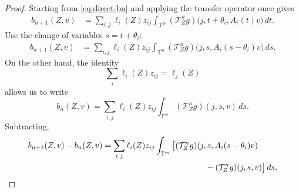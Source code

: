 \documentclass[11pt,a4paper]{amsart}
\newcommand{\T}{\mathbb T}
\begin{document}
\begin{proof}

Starting from \eqref{eq:direct-bn} and applying the transfer operator
once gives
\[
\begin{aligned}
 b_{n+1}(Z,v)
 &=
 \sum_{i,j}\ell_i(Z)z_{ij}
 \int_{\T^m}
 (\mathcal T_Z^ng)
 \bigl(j,t+\theta_i,A_i(t)v\bigr)\,dt.
\end{aligned}
\]
Use the change of variables \(s=t+\theta_i\):
\[
\begin{aligned}
 b_{n+1}(Z,v)
 &=
 \sum_{i,j}\ell_i(Z)z_{ij}
 \int_{\T^m}
 (\mathcal T_Z^ng)
 \bigl(j,s,A_i(s-\theta_i)v\bigr)\,ds.
\end{aligned}
\]
On the other hand, the identity
\[
 \sum_i\ell_i(Z)z_{ij}=\ell_j(Z)
\]
allows us to write
\[
 b_n(Z,v)
 =
 \sum_{i,j}\ell_i(Z)z_{ij}
 \int_{\T^m}(\mathcal T_Z^ng)(j,s,v)\,ds.
\]
Subtracting,
\begin{align}
 b_{n+1}(Z,v)-b_n(Z,v)
 &=
 \sum_{i,j}\ell_i(Z)z_{ij}
 \int_{\T^m}
 \big[
 (\mathcal T_Z^ng)
   (j,s,A_i(s-\theta_i)v)\notag\\
 &\hspace{44mm}
 -(\mathcal T_Z^ng)(j,s,v)
 \big]\,ds.
\label{eq:direct-difference}
\end{align}


\end{proof}
\end{document}
